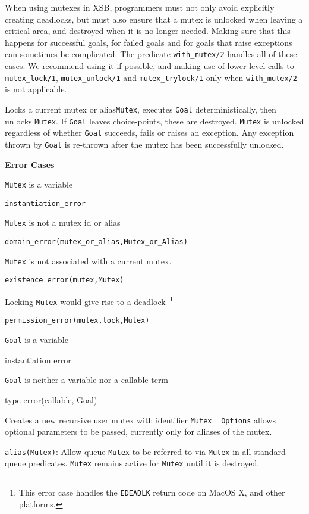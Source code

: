 When using mutexes in XSB, programmers must not only avoid explicitly
creating deadlocks, but must also ensure that a mutex is unlocked when
leaving a critical area, and destroyed when it is no longer needed.
Making sure that this happens for successful goals, for failed goals
and for goals that raise exceptions can sometimes be complicated.  The
predicate {\tt with\_mutex/2} handles all of these cases.  We
recommend using it if possible, and making use of lower-level calls to
{\tt mutex\_lock/1}, {\tt mutex\_unlock/1} and {\tt mutex\_trylock/1}
only when {\tt with\_mutex/2} is not applicable.

\begin{description}
%
Locks a current mutex or alias{\tt Mutex}, executes {\tt Goal}
deterministically, then unlocks {\tt Mutex}.  If {\tt Goal} leaves
choice-points, these are destroyed.  {\tt Mutex} is unlocked
regardless of whether {\tt Goal} succeeds, fails or raises an
exception. Any exception thrown by {\tt Goal} is re-thrown after the
mutex has been successfully unlocked.

{\bf Error Cases}
\bi
\item 	{\tt Mutex} is a variable
\bi
\item 	{\tt instantiation\_error}
\ei
%
\item 	{\tt Mutex} is not a mutex id or alias
\bi
\item 	{\tt domain\_error(mutex\_or\_alias,Mutex\_or\_Alias)}
\ei
%
\item 	{\tt Mutex} is not associated with a current mutex.
\bi
\item 	{\tt existence\_error(mutex,Mutex)}
\ei
\item Locking {\tt Mutex} would give rise to a deadlock~\footnote{This
  error case handles the {\tt EDEADLK} return code on MacOS X, and other
  platforms.}
\bi
\item 	{\tt permission\_error(mutex,lock,Mutex)}
\ei
\item {\tt Goal} is a variable
\bi
\item  instantiation error
\ei
%
\item {\tt Goal} is neither a variable nor a callable term
\bi
\item type error(callable, Goal)
\ei
%
\ei

%
Creates a new recursive user mutex with identifier {\tt Mutex}.  {\tt
  Options} allows optional parameters to be passed, currently only for
aliases of the mutex.
%
\bi
\item {\tt alias(Mutex)}: Allow queue {\tt Mutex} to be referred to
  via {\tt Mutex} in all standard queue predicates.  {\tt Mutex}
  remains active for {\tt Mutex} until it is destroyed.
\ei


\end{description}
